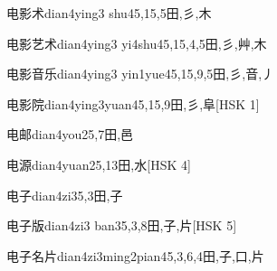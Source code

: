 \begin{EntryWithPhonetic}{电影术}{dian4ying3 shu4}{5,15,5}{⽥,⼺,⽊}
\end{EntryWithPhonetic}

\begin{EntryWithPhonetic}{电影艺术}{dian4ying3 yi4shu4}{5,15,4,5}{⽥,⼺,⾋,⽊}
\end{EntryWithPhonetic}

\begin{EntryWithPhonetic}{电影音乐}{dian4ying3 yin1yue4}{5,15,9,5}{⽥,⼺,⾳,⼃}
\end{EntryWithPhonetic}

\begin{EntryWithPhonetic}{电影院}{dian4ying3yuan4}{5,15,9}{⽥,⼺,⾩}[HSK 1]
\end{EntryWithPhonetic}

\begin{EntryWithPhonetic}{电邮}{dian4you2}{5,7}{⽥,⾢}
\end{EntryWithPhonetic}

\begin{EntryWithPhonetic}{电源}{dian4yuan2}{5,13}{⽥,⽔}[HSK 4]
\end{EntryWithPhonetic}

\begin{EntryWithPhonetic}{电子}{dian4zi3}{5,3}{⽥,⼦}
\end{EntryWithPhonetic}

\begin{EntryWithPhonetic}{电子版}{dian4zi3 ban3}{5,3,8}{⽥,⼦,⽚}[HSK 5]
\end{EntryWithPhonetic}

\begin{EntryWithPhonetic}{电子名片}{dian4zi3ming2pian4}{5,3,6,4}{⽥,⼦,⼝,⽚}
\end{EntryWithPhonetic}

